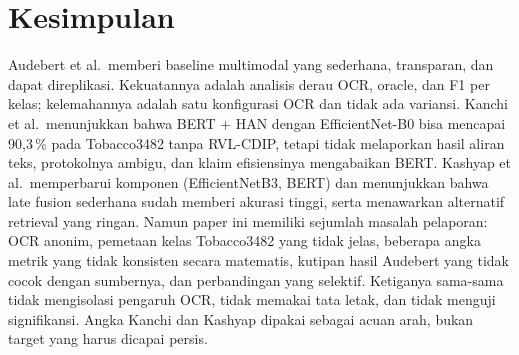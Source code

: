 \section{Kesimpulan}
Audebert et al.\ memberi baseline multimodal yang sederhana, transparan, dan dapat
direplikasi. Kekuatannya adalah analisis derau OCR, oracle, dan F1 per kelas; kelemahannya
adalah satu konfigurasi OCR dan tidak ada variansi. Kanchi et al.\ menunjukkan bahwa BERT +
HAN dengan EfficientNet-B0 bisa mencapai 90,3\,\% pada Tobacco3482 tanpa RVL-CDIP, tetapi
tidak melaporkan hasil aliran teks, protokolnya ambigu, dan klaim efisiensinya mengabaikan
BERT. Kashyap et al.\ memperbarui komponen (EfficientNetB3, BERT) dan menunjukkan bahwa late
fusion sederhana sudah memberi akurasi tinggi, serta menawarkan alternatif retrieval yang
ringan. Namun paper ini memiliki sejumlah masalah pelaporan: OCR anonim, pemetaan kelas
Tobacco3482 yang tidak jelas, beberapa angka metrik yang tidak konsisten secara matematis,
kutipan hasil Audebert yang tidak cocok dengan sumbernya, dan perbandingan yang selektif.
Ketiganya sama-sama tidak mengisolasi pengaruh OCR, tidak memakai tata letak, dan tidak
menguji signifikansi. Angka Kanchi dan Kashyap dipakai sebagai acuan arah, bukan target
yang harus dicapai persis.
